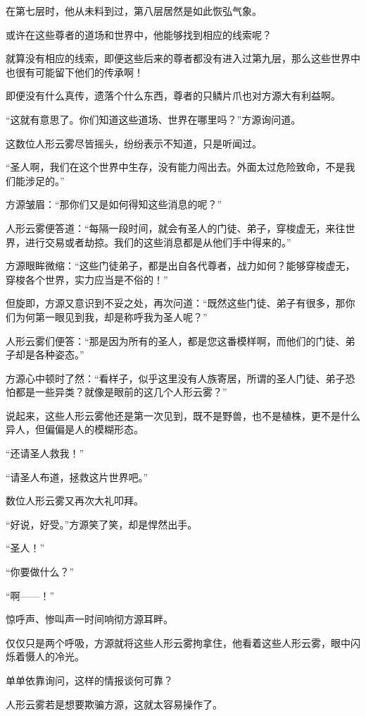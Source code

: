 \begin{this_body}
在第七层时，他从未料到过，第八层居然是如此恢弘气象。

或许在这些尊者的道场和世界中，他能够找到相应的线索呢？

就算没有相应的线索，即便这些后来的尊者都没有进入过第九层，那么这些世界中也很有可能留下他们的传承啊！

即便没有什么真传，遗落个什么东西，尊者的只鳞片爪也对方源大有利益啊。

“这就有意思了。你们知道这些道场、世界在哪里吗？”方源询问道。

这数位人形云雾尽皆摇头，纷纷表示不知道，只是听闻过。

“圣人啊，我们在这个世界中生存，没有能力闯出去。外面太过危险致命，不是我们能涉足的。”

方源皱眉：“那你们又是如何得知这些消息的呢？”

人形云雾便答道：“每隔一段时间，就会有圣人的门徒、弟子，穿梭虚无，来往世界，进行交易或者劫掠。我们的这些消息都是从他们手中得来的。”

方源眼眸微缩：“这些门徒弟子，都是出自各代尊者，战力如何？能够穿梭虚无，穿梭各个世界，实力应当是不俗的！”

但旋即，方源又意识到不妥之处，再次问道：“既然这些门徒、弟子有很多，那你们为何第一眼见到我，却是称呼我为圣人呢？”

人形云雾们便答：“那是因为所有的圣人，都是您这番模样啊，而他们的门徒、弟子却是各种姿态。”

方源心中顿时了然：“看样子，似乎这里没有人族寄居，所谓的圣人门徒、弟子恐怕都是一些异类？就像是眼前的这几个人形云雾？”

说起来，这些人形云雾他还是第一次见到，既不是野兽，也不是植株，更不是什么异人，但偏偏是人的模糊形态。

“还请圣人救我！”

“请圣人布道，拯救这片世界吧。”

数位人形云雾又再次大礼叩拜。

“好说，好受。”方源笑了笑，却是悍然出手。

“圣人！”

“你要做什么？”

“啊——！”

惊呼声、惨叫声一时间响彻方源耳畔。

仅仅只是两个呼吸，方源就将这些人形云雾拘拿住，他看着这些人形云雾，眼中闪烁着慑人的冷光。

单单依靠询问，这样的情报谈何可靠？

人形云雾若是想要欺骗方源，这就太容易操作了。


\end{this_body}
